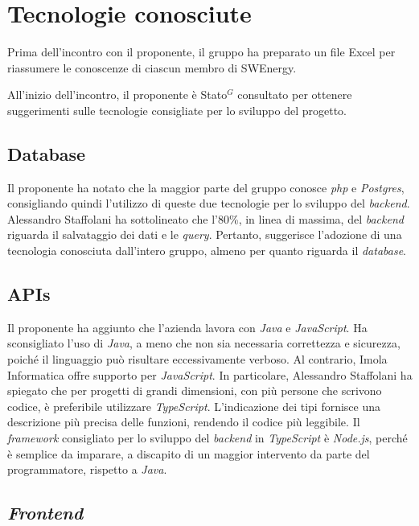 \section{Tecnologie conosciute}

Prima dell'incontro con il proponente, il gruppo ha preparato un file Excel
per riassumere le conoscenze di ciascun membro di SWEnergy.

All'inizio dell'incontro, il proponente è \gls{Stato}$^G$ consultato per ottenere
suggerimenti sulle tecnologie consigliate per lo sviluppo del progetto.

\subsection{Database}

Il proponente ha notato che la maggior parte del gruppo conosce \textit{php} e
\textit{Postgres}, consigliando quindi l'utilizzo di queste due tecnologie per
lo sviluppo del \textit{backend}. Alessandro Staffolani ha sottolineato che l'80\%, in linea di
massima, del \textit{backend} riguarda il salvataggio dei dati e le \textit{query}. Pertanto,
suggerisce l'adozione di una tecnologia conosciuta dall'intero gruppo, almeno
per quanto riguarda il \textit{database}.

\subsection{APIs}

Il proponente ha aggiunto che l'azienda lavora con \textit{Java} e
\textit{JavaScript}. Ha sconsigliato l'uso di \textit{Java}, a meno che non sia
necessaria correttezza e sicurezza, poiché il linguaggio può risultare
eccessivamente verboso. Al contrario, Imola Informatica offre supporto per
\textit{JavaScript}. In particolare, Alessandro Staffolani ha spiegato che per progetti di
grandi dimensioni, con più persone che scrivono codice, è preferibile
utilizzare \textit{TypeScript}. L'indicazione dei tipi fornisce una
descrizione più precisa delle funzioni, rendendo il codice più leggibile. Il
\textit{framework} consigliato per lo sviluppo del \textit{backend} in
\textit{TypeScript} è \textit{Node.js}, perché è semplice da imparare, a
discapito di un maggior intervento da parte del programmatore,
rispetto a \textit{Java}.

\subsection{\textit{Frontend}}

